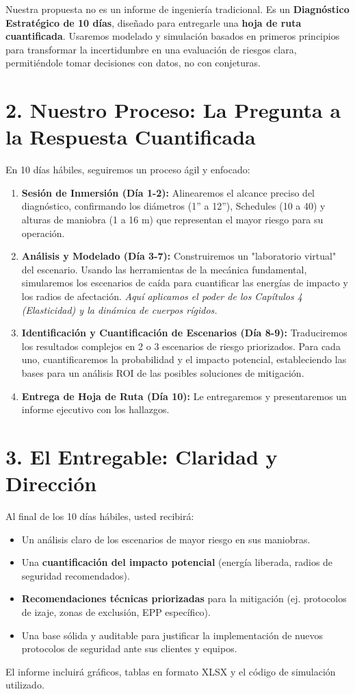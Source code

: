 \documentclass[a4paper,11pt]{article}
\begin{document}
Nuestra propuesta no es un informe de ingeniería tradicional. Es un \textbf{Diagnóstico Estratégico de 10 días}, diseñado para entregarle una \textbf{hoja de ruta cuantificada}. Usaremos modelado y simulación basados en primeros principios para transformar la incertidumbre en una evaluación de riesgos clara, permitiéndole tomar decisiones con datos, no con conjeturas.

\section*{2. Nuestro Proceso: La Pregunta a la Respuesta Cuantificada}
En 10 días hábiles, seguiremos un proceso ágil y enfocado:

\begin{enumerate}
    \item \textbf{Sesión de Inmersión (Día 1-2):} Alinearemos el alcance preciso del diagnóstico, confirmando los diámetros (1'' a 12''), Schedules (10 a 40) y alturas de maniobra (1 a 16 m) que representan el mayor riesgo para su operación.
    
    \item \textbf{Análisis y Modelado (Día 3-7):} Construiremos un "laboratorio virtual" del escenario. Usando las herramientas de la mecánica fundamental, simularemos los escenarios de caída para cuantificar las energías de impacto y los radios de afectación. \textit{Aquí aplicamos el poder de los Capítulos 4 (Elasticidad) y la dinámica de cuerpos rígidos.}
    
    \item \textbf{Identificación y Cuantificación de Escenarios (Día 8-9):} Traduciremos los resultados complejos en 2 o 3 escenarios de riesgo priorizados. Para cada uno, cuantificaremos la probabilidad y el impacto potencial, estableciendo las bases para un análisis ROI de las posibles soluciones de mitigación.
    
    \item \textbf{Entrega de Hoja de Ruta (Día 10):} Le entregaremos y presentaremos un informe ejecutivo con los hallazgos.
\end{enumerate}

\section*{3. El Entregable: Claridad y Dirección}
Al final de los 10 días hábiles, usted recibirá:
\begin{itemize}
    \item Un análisis claro de los escenarios de mayor riesgo en sus maniobras.
    \item Una \textbf{cuantificación del impacto potencial} (energía liberada, radios de seguridad recomendados).
    \item \textbf{Recomendaciones técnicas priorizadas} para la mitigación (ej. protocolos de izaje, zonas de exclusión, EPP específico).
    \item Una base sólida y auditable para justificar la implementación de nuevos protocolos de seguridad ante sus clientes y equipos.
\end{itemize}
El informe incluirá gráficos, tablas en formato XLSX y el código de simulación utilizado.
\end{document}
